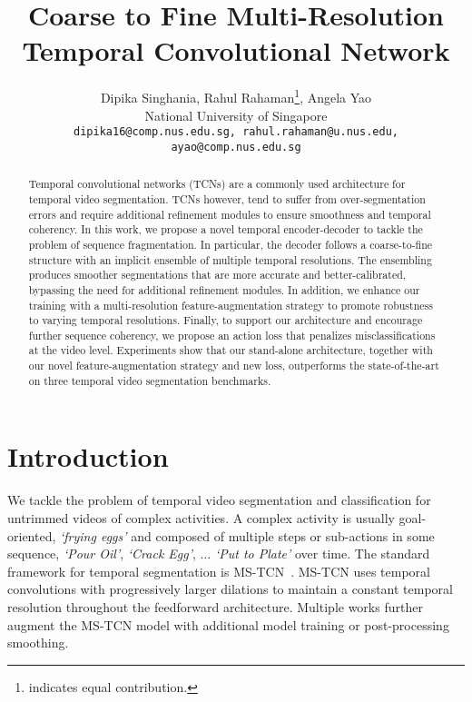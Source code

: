 \documentclass[10pt,twocolumn,letterpaper]{article}
\begin{document}
\title{Coarse to Fine Multi-Resolution Temporal Convolutional Network}
\author{
Dipika Singhania, Rahul Rahaman\thanks{ indicates equal contribution. }, Angela Yao\\
National University of Singapore\\
{\tt\small dipika16@comp.nus.edu.sg, rahul.rahaman@u.nus.edu, ayao@comp.nus.edu.sg}
}




\maketitle
\ificcvfinal\thispagestyle{empty}\fi

\begin{abstract}
    Temporal convolutional networks (TCNs) are a commonly used architecture for temporal video segmentation.  TCNs however, tend to suffer from over-segmentation errors and require additional refinement modules to ensure smoothness and temporal coherency. In this work, we propose a novel temporal encoder-decoder to tackle the problem of sequence fragmentation.  In particular, the decoder follows a coarse-to-fine structure with an implicit ensemble of multiple temporal resolutions.  The ensembling produces smoother segmentations that are more accurate and better-calibrated, bypassing the need for additional refinement modules. In addition, we enhance our training with a multi-resolution feature-augmentation strategy to promote robustness to varying temporal resolutions.  Finally, to support our architecture and encourage further sequence coherency, we propose an action loss that penalizes misclassifications at the video level. Experiments show that our stand-alone architecture, together with our novel feature-augmentation strategy and new loss, outperforms the state-of-the-art on three temporal video segmentation benchmarks. 
\end{abstract}

\section{Introduction}\label{sec:introduction}


We tackle the problem of temporal video segmentation and classification for untrimmed videos of complex activities. A complex activity is usually goal-oriented, \eg \emph{`frying eggs'} and composed of multiple steps or sub-actions in some sequence, \eg \emph{`Pour Oil'}, \emph{`Crack Egg'}, ... 
\emph{`Put to Plate'} over time.  The standard framework for temporal segmentation is MS-TCN~\cite{li2020ms, farha2019ms}. MS-TCN uses
temporal convolutions with progressively larger dilations to maintain a constant temporal resolution throughout the feedforward architecture. Multiple works further augment the MS-TCN model \cite{wang2020boundary, wang2020gated} with additional model training or post-processing smoothing. 
\end{document}
